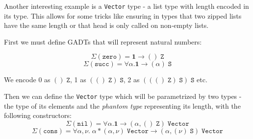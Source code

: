 \begin{sidewaysfigure}
\begin{prooftree}
    
    
    
    
  \end{prooftree}
\end{sidewaysfigure}

\restoregeometry

Another interesting example is a \texttt{Vector} type - a list type with length encoded in its type. This allows for some tricks like ensuring in types that two zipped lists have the same length or that head is only called on non-empty lists.

First we must define GADTs that will represent natural numbers:

\[
\Sigma(\texttt{zero}) = \mathbf{1} \to () \; \texttt{Z}
\]
\[
\Sigma(\texttt{succ}) = \forall \alpha. \mathbf{1} \to (\alpha) \; \texttt{S}
\]

We encode 0 as $() \; \texttt{Z}$, 1 as $(() \; \texttt{Z}) \; \texttt{S}$, 2 as $((() \; \texttt{Z}) \; \texttt{S}) \; \texttt{S}$ etc.

Then we can define the \texttt{Vector} type which will be parametrized by two types - the type of its elements and the \textit{phantom type}\cite{TODO} representing its length, with the following constructors:
\[
\Sigma(\texttt{nil}) = \forall \alpha. \mathbf{1} \to (\alpha, () \; \texttt{Z}) \; \texttt{Vector}
\]
\[
\Sigma(\texttt{cons}) = \forall \alpha, \nu. \; \alpha * (\alpha, \nu) \; \texttt{Vector} \to (\alpha, (\nu) \; \texttt{S}) \; \texttt{Vector}
\]

